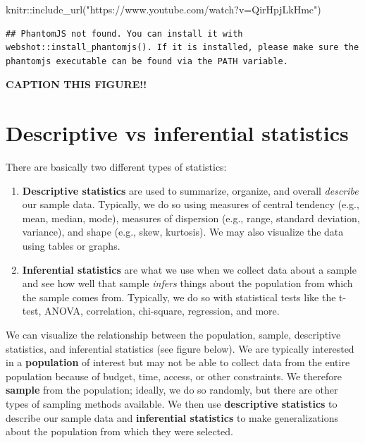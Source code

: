 \documentclass[
]{book}
\newenvironment{Shaded}{\begin{snugshade}}{\end{snugshade}}
\newcommand{\FunctionTok}[1]{\textcolor[rgb]{0.00,0.00,0.00}{#1}}
\newcommand{\NormalTok}[1]{#1}
\newcommand{\SpecialCharTok}[1]{\textcolor[rgb]{0.00,0.00,0.00}{#1}}
\newcommand{\StringTok}[1]{\textcolor[rgb]{0.31,0.60,0.02}{#1}}
\begin{document}
\begin{Shaded}
\begin{Highlighting}[]
\NormalTok{knitr}\SpecialCharTok{::}\FunctionTok{include\_url}\NormalTok{(}\StringTok{"https://www.youtube.com/watch?v=QirHpjLkHmc"}\NormalTok{)}
\end{Highlighting}
\end{Shaded}

\begin{verbatim}
## PhantomJS not found. You can install it with webshot::install_phantomjs(). If it is installed, please make sure the phantomjs executable can be found via the PATH variable.
\end{verbatim}

\label{fig:unnamed-chunk-1}\textbf{CAPTION THIS FIGURE!!}

\hypertarget{descriptive-vs-inferential-statistics}{%
\section{Descriptive vs inferential statistics}\label{descriptive-vs-inferential-statistics}}

There are basically two different types of statistics:

\begin{enumerate}
\def\labelenumi{\arabic{enumi}.}
\item
  \textbf{Descriptive statistics} are used to summarize, organize, and overall \emph{describe} our sample data. Typically, we do so using measures of central tendency (e.g., mean, median, mode), measures of dispersion (e.g., range, standard deviation, variance), and shape (e.g., skew, kurtosis). We may also visualize the data using tables or graphs.
\item
  \textbf{Inferential statistics} are what we use when we collect data about a sample and see how well that sample \emph{infers} things about the population from which the sample comes from. Typically, we do so with statistical tests like the t-test, ANOVA, correlation, chi-square, regression, and more.
\end{enumerate}

We can visualize the relationship between the population, sample, descriptive statistics, and inferential statistics (see figure below). We are typically interested in a \textbf{population} of interest but may not be able to collect data from the entire population because of budget, time, access, or other constraints. We therefore \textbf{sample} from the population; ideally, we do so randomly, but there are other types of sampling methods available. We then use \textbf{descriptive statistics} to describe our sample data and \textbf{inferential statistics} to make generalizations about the population from which they were selected.
\end{document}
